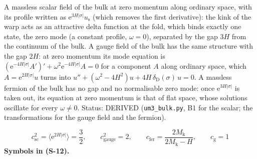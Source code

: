 \documentclass[
  10pt,
]{article}
\begin{document}
A massless scalar field of the bulk at zero momentum along ordinary
space, with its profile written as
\(\mathrm{e}^{3H\lvert\sigma\rvert}u_{\mathrm{s}}\) (which removes the
first derivative): the kink of the warp acts as an attractive delta
function at the fold, which binds exactly one state, the zero mode (a
constant profile, \(\omega = 0\)), separated by the gap \(3H\) from the
continuum of the bulk. A gauge field of the bulk has the same structure
with the gap \(2H\): at zero momentum its mode equation is
\((\mathrm{e}^{-4H\lvert\sigma\rvert}A')' + \omega^2\mathrm{e}^{-4H\lvert\sigma\rvert}A = 0\)
for a component \(A\) along ordinary space, which
\(A = \mathrm{e}^{2H\lvert\sigma\rvert}u\) turns into
\(u'' + (\omega^2 - 4H^2)u + 4H\,\delta_{\mathrm{D}}(\sigma)\,u = 0\). A
massless fermion of the bulk has no gap and no normalisable zero mode:
once \(\mathrm{e}^{3H\lvert\sigma\rvert}\) is taken out, its equation at
zero momentum is that of flat space, whose solutions oscillate for every
\(\omega \ne 0\). Status: DERIVED (\texttt{um3\_bulk.py}, B1 for the
scalar; the transformations for the gauge field and the fermion).

\[
c_{\mathrm{sc}}^2 = \big\langle\mathrm{e}^{2H\lvert\sigma\rvert}\big\rangle = \frac32,\qquad c_{\mathrm{gauge}}^2 = 2,\qquad
c_{\mathrm{fer}} = \frac{2M_{\mathrm{k}}}{2M_{\mathrm{k}} - H},\qquad c_{\mathrm{g}} = 1 \tag{S-12}
\] \textbf{Symbols in (S-12).}
\end{document}
